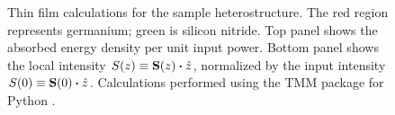 \begin{figure}
	\centering

	\caption{Thin film calculations for the sample heterostructure. The red region represents germanium; green is silicon nitride. Top panel shows the absorbed energy density per unit input power. Bottom panel shows the local intensity $S(z) \equiv \vb{S}(z) \vdot \hat{z}$, normalized by the input intensity $S(0) \equiv \vb{S}(0) \vdot \hat{z}$. Calculations performed using the TMM package for Python \cite{byrnesTmmSimulateLight2017,byrnesMultilayerOpticalCalculations2019}.}
	\label{fig:GeSiN_RAT:delay}
\end{figure}

